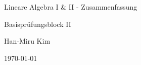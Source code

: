 
\begin{titlepage} %

	\Large %

	\centering %
	
	\vspace*{5\baselineskip} %
    
	
	\vspace{0.75\baselineskip} %
	

	{\huge Lineare Algebra I \& II - Zusammenfassung}
	
	\vspace{0.75\baselineskip} %
	

	\vspace{1\baselineskip}

	Basisprüfungsblock II

	\vspace*{2\baselineskip} %
	

	\vspace{1\baselineskip}

	
	\vspace{0.5\baselineskip} %
	
	Han-Miru Kim
	
	\vspace{0.5\baselineskip} %
	
	
	\today %

\end{titlepage}